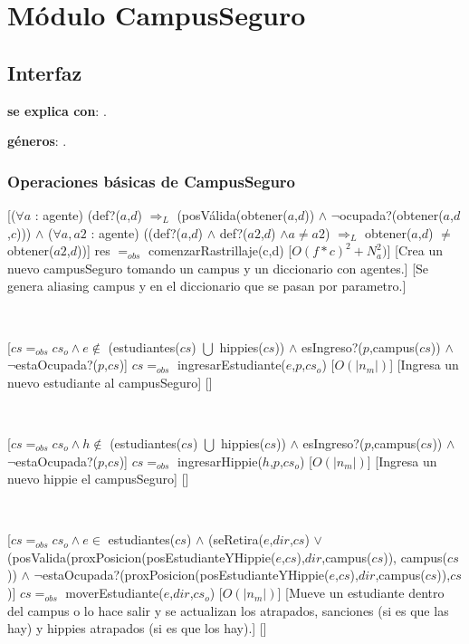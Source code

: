 \section{Módulo CampusSeguro}

\subsection{Interfaz}

\textbf{se explica con}: .

\textbf{géneros}: .

\subsubsection{Operaciones básicas de CampusSeguro}

[($\forall a$ : agente) (def?($a$,$d$) $\Rightarrow_L$ (posVálida(obtener($a$,$d$)) $\land$ $\neg$ocupada?(obtener($a$,$d$,$c$))) $\land$ ($\forall a, a2$ : agente) ((def?($a$,$d$) $\land$ def?($a2$,$d$) $\land a \neq a2$) $\Rightarrow_L$ obtener($a$,$d$) $\neq$ obtener($a2$,$d$))]
{res $=_{obs}$ comenzarRastrillaje(c,d)}
[$O(f*c)^2 + N_a^2)$]
[Crea un nuevo campusSeguro tomando un campus y un diccionario con agentes.]
[Se genera aliasing campus y en el diccionario que se pasan por parametro.]

~

[$cs =_{obs} cs_o \land e \not\in$ (estudiantes($cs$) $\bigcup$ hippies($cs$)) $\land$ esIngreso?($p$,campus($cs$)) $\land$ $\neg$estaOcupada?($p$,$cs$)]
{$cs =_{obs}$ ingresarEstudiante($e$,$p$,$cs_o$)}
[$O(|n_m|)$]
[Ingresa un nuevo estudiante al campusSeguro]
[]

~

[$cs =_{obs} cs_o \land h \not\in$ (estudiantes($cs$) $\bigcup$ hippies($cs$)) $\land$ esIngreso?($p$,campus($cs$)) $\land$ $\neg$estaOcupada?($p$,$cs$)]
{$cs =_{obs}$ ingresarHippie($h$,$p$,$cs_o$)}
[$O(|n_m|)$]
[Ingresa un nuevo hippie el campusSeguro]
[]

~

[$cs =_{obs} cs_o \land e \in$ estudiantes($cs$) $\land$ (seRetira($e$,$dir$,$cs$) $\lor$ \\
(posValida(proxPosicion(posEstudianteYHippie($e$,$cs$),$dir$,campus($cs$)), campus($cs$)) $\land$ $\neg$estaOcupada?(proxPosicion(posEstudianteYHippie($e$,$cs$),$dir$,campus($cs$)),$cs$)]
{$cs =_{obs}$ moverEstudiante($e$,$dir$,$cs_o$)}
[$O(|n_m|)$]
[Mueve un estudiante dentro del campus o lo hace salir y se actualizan los atrapados, sanciones (si es que las hay) y hippies atrapados (si es que los hay).]
[]

